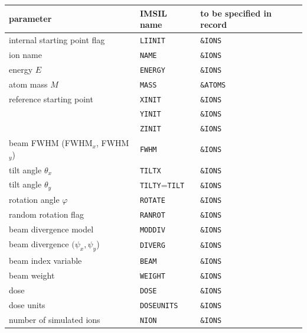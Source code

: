 \begin{center}
\begin{tabular}{lll}
parameter \quad                   & IMSIL name & to be specified in record \\
\hline
internal starting point flag      & \texttt{LIINIT}    & \texttt{\&IONS} \\
ion name                          & \texttt{NAME}      & \texttt{\&IONS} \\
energy $E$                        & \texttt{ENERGY}    & \texttt{\&IONS} \\
atom mass $M$                     & \texttt{MASS}      & \texttt{\&ATOMS} \\
reference starting point          & \texttt{XINIT}     & \texttt{\&IONS} \\
                                  & \texttt{YINIT}     & \texttt{\&IONS} \\
                                  & \texttt{ZINIT}     & \texttt{\&IONS} \\
beam FWHM (FWHM$_x$, FWHM$_y$)    & \texttt{FWHM}      & \texttt{\&IONS} \\
tilt angle $\theta_x$             & \texttt{TILTX}     & \texttt{\&IONS} \\
tilt angle $\theta_y$   & \texttt{TILTY}=\texttt{TILT} & \texttt{\&IONS} \\
rotation angle $\varphi$          & \texttt{ROTATE}    & \texttt{\&IONS} \\
random rotation flag              & \texttt{RANROT}    & \texttt{\&IONS} \\
beam divergence model             & \texttt{MODDIV}    & \texttt{\&IONS} \\
beam divergence $(\psi_x,\psi_y$) & \texttt{DIVERG}    & \texttt{\&IONS} \\
beam index variable               & \texttt{BEAM}      & \texttt{\&IONS} \\
beam weight                       & \texttt{WEIGHT}    & \texttt{\&IONS} \\
dose                              & \texttt{DOSE}      & \texttt{\&IONS} \\
dose units                        & \texttt{DOSEUNITS} & \texttt{\&IONS} \\
number of simulated ions          & \texttt{NION}      & \texttt{\&IONS} \\
\end{tabular}
\end{center}

